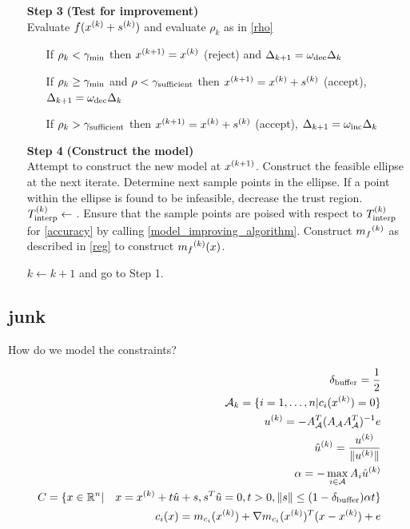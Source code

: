 \begin{algorithm}[H]
\begin{itemize}
        \item[\textbf{Step 3}] \textbf{(Test for improvement)} \\
            Evaluate $f({x}^{(k)} + {{s}^{(k)}})$ and evaluate $\rho_k$ as in \cref{rho} \begin{itemize}
                \item[] If $\rho_k < \gamma_{\text{min}}$ then ${x}^{(k+1)}={x}^{(k)}$ (reject) and $\Delta_{k+1} = \omega_{\text{dec}}\Delta_{k}$
                \item[] If $\rho_k \ge \gamma_{\text{min}}$ and $\rho < \gamma_{\text{sufficient}}$ then ${x}^{(k+1)}={x}^{(k)}+{{s}^{(k)}}$ (accept), $\Delta_{k+1} = \omega_{\text{dec}}\Delta_{k}$
                \item[] If $\rho_k > \gamma_{\text{sufficient}}$ then ${x}^{(k+1)}={x}^{(k)}+{{s}^{(k)}}$ (accept), $\Delta_{k+1} = \omega_{\text{inc}}\Delta_{k}$
            \end{itemize}
            
        \item[\textbf{Step 4}] \textbf{(Construct the model)} \\
            Attempt to construct the new model at ${x}^{(k+1)}$.
            Construct the feasible ellipse at the next iterate.
            Determine next sample points in the ellipse.
            If a point within the ellipse is found to be infeasible, decrease the trust region.
            $ {T_{\text{interp}}^{(k)}} \gets $ .
            Ensure that the sample points are poised with respect to $ {T_{\text{interp}}^{(k)}} $ for \cref{accuracy} by calling \cref{model_improving_algorithm}.
            Construct ${{m}_f}^{(k)}$ as described in \cref{reg} to construct ${{m}_f}^{(k)}(x)$.
            
        $k \gets k+1$ and go to Step 1.
    \end{itemize}
\end{algorithm}





\subsection{junk}

How do we model the constraints?

\begin{align*}
{\delta_{\text{buffer}}} = \frac 1 2 \\
\mathcal A_k = \{i =  1,\ldots, n| c_i({x^{(k)}}) = 0\} \\
u^{(k)} = -A_{\mathcal A}^T(A_{\mathcal A}A_{\mathcal A}^T)^{-1} e\\
\hat u^{(k)} = \frac {u^{(k)}} {\| u^{(k)}\|}\\
\alpha = -\max_{i \in \mathcal A} A_i \hat u^{(k)} \\
C = \{x \in \mathbb R^n | \quad x = {x^{(k)}} + t\hat u + s, s^T\hat u = 0, t > 0, \|s\| \le (1 - {\delta_{\text{buffer}}})\alpha t\} \\
c_i(x) = m_{c_i}({x^{(k)}}) + \nabla m_{c_i}({x^{(k)}})^T(x - {x^{(k)}}) + e \\
\end{align*}

